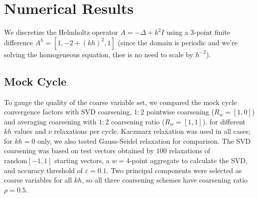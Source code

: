 \documentclass{article}
\begin{document}
\section{Numerical Results}
We discretize the Helmholtz operator $A = -\Delta + k^2 I$ using a $3$-point finite difference $A^h = [1, -2 + (kh)^2, 1]$ (since the domain is periodic and we're solving the homogeneous equation, thee is no need to scale by $h^{-2}$).


\subsection{Mock Cycle}
\label{mock_cycle}
To gauge the quality of the coarse variable set, we compared the mock cycle convergence factors with SVD coarsening, $1:2$ pointwise coarsening ($R_w = [1, 0]$) and averaging coarsening with $1:2$ coarsening ratio ($R_w = [1, 1]$). for different $kh$ values and $\nu$ relaxations per cycle. Kaczmarz relaxation was used in all cases; for $kh=0$ only, we also tested Gauss-Seidel relaxation for comparison. The SVD coarsening was based on test vectors obtained by $100$ relaxations of $\text{random}[-1,1]$ starting vectors, a $w=4$-point aggregate to calculate the SVD, and accuracy threshold of  $\varepsilon=0.1$. Two principal components were selected as coarse variables for all $kh$, so all three coarsening schemes have coarsening ratio $\rho = 0.5$.
 
\end{document}
